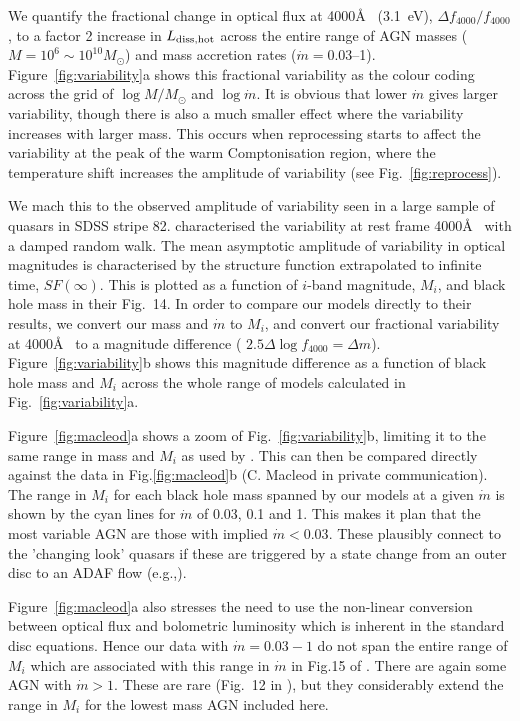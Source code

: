 \documentclass[a4paper,fleqn,usenatbib]{mnras}
\begin{document}
We quantify the fractional change in optical flux at 4000\AA~
(3.1~eV), $\Delta f_{4000}/f_{4000}$, to a factor 2 increase in
$L_{\rm diss,hot}$ across the entire range of AGN masses ($M=10^6\sim
  10^{10}M_\odot$) and mass accretion rates ($\dot{m}=0.03$--1). 
Figure~\ref{fig:variability}a shows
this fractional variability as the colour coding across the grid of
$\log M/M_\odot$ and $\log \dot{m}$.  It is obvious that lower
$\dot{m}$ gives larger variability, though there is also a much
smaller effect where the variability increases with larger mass. This
occurs when reprocessing starts to affect the variability at the peak
of the warm Comptonisation region, where the temperature shift
increases the amplitude of variability (see Fig.~\ref{fig:reprocess}).

We mach this to the observed amplitude of variability seen in a large
sample of quasars in SDSS stripe 82.  \cite{macleod2010} characterised
the variability at rest frame 4000\AA~ with a damped random walk.  The
mean asymptotic amplitude of variability in optical magnitudes%
is characterised by the structure function extrapolated
to infinite time, $SF(\infty)$. This is plotted as a function of
$i$-band magnitude, $M_i$, and black hole mass in their Fig.~14. In
order to compare our models directly to their results, we convert our
mass and $\dot{m}$ to $M_i$, and  convert our fractional
variability at 4000\AA~ to a magnitude difference ( $2.5 \Delta \log
f_{4000} = \Delta m $). Figure~\ref{fig:variability}b shows 
this magnitude
difference as a function of black hole mass and $M_i$ across the whole
range of models calculated in Fig.~\ref{fig:variability}a. 

Figure~\ref{fig:macleod}a shows a zoom of Fig.~\ref{fig:variability}b,
limiting it to the same range in mass and $M_i$ as used by
\cite{macleod2010}. This can then be compared directly against the
data in Fig.\ref{fig:macleod}b (C. Macleod in private
communication). 
The range in $M_i$ for each black hole mass spanned by our models at a
given $\dot{m}$ is shown by the cyan lines for 
$\dot{m}$ of 0.03, 0.1 and 1. 
 This makes it plan that the
most variable AGN are those with implied  $\dot{m}<0.03$. These 
plausibly connect to the 'changing look' quasars if
these are triggered by a state change from an outer disc to an ADAF
flow (e.g.,\citealt{noda2018}). 

Figure~\ref{fig:macleod}a also stresses the need to use the non-linear
conversion between optical flux and bolometric luminosity which is
inherent in the standard disc equations. Hence our data 
with $\dot{m}=0.03-1$ do not span
the entire range of $M_i$ which are associated with this range in
$\dot{m}$ in Fig.15 of \cite{macleod2010}.
There are again some AGN with 
$\dot{m}>1$. These are rare (Fig.~12 in \citealt{macleod2010}), but
they considerably extend the range in $M_i$ for the lowest mass AGN
included here. 
\end{document}

